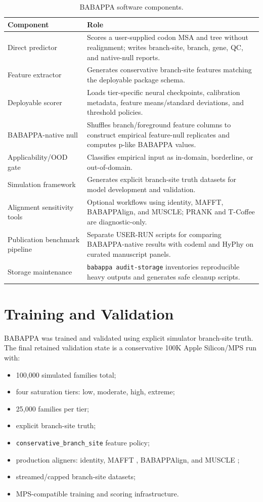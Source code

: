 \documentclass[11pt,a4paper]{article}
\begin{document}
\begin{longtable}{p{}p{}}
\caption{BABAPPA software components.}
\label{tab:components}\\
\toprule
\textbf{Component} & \textbf{Role} \\
\midrule
Direct predictor & Scores a user-supplied codon MSA and tree without realignment; writes branch-site, branch, gene, QC, and native-null reports. \\
Feature extractor & Generates conservative branch-site features matching the deployable package schema. \\
Deployable scorer & Loads tier-specific neural checkpoints, calibration metadata, feature means/standard deviations, and threshold policies. \\
BABAPPA-native null & Shuffles branch/foreground feature columns to construct empirical feature-null replicates and computes p-like BABAPPA values. \\
Applicability/OOD gate & Classifies empirical input as in-domain, borderline, or out-of-domain. \\
Simulation framework & Generates explicit branch-site truth datasets for model development and validation. \\
Alignment sensitivity tools & Optional workflows using identity, MAFFT, BABAPPAlign, and MUSCLE; PRANK and T-Coffee are diagnostic-only. \\
Publication benchmark pipeline & Separate USER-RUN scripts for comparing BABAPPA-native results with codeml and HyPhy on curated manuscript panels. \\
Storage maintenance & \texttt{babappa audit-storage} inventories reproducible heavy outputs and generates safe cleanup scripts. \\
\bottomrule
\end{longtable}

\section{Training and Validation}

BABAPPA was trained and validated using explicit simulator branch-site truth. The final retained validation state is a conservative 100K Apple Silicon/MPS run with:

\begin{itemize}[leftmargin=*]
  \item 100,000 simulated families total;
  \item four saturation tiers: low, moderate, high, extreme;
  \item 25,000 families per tier;
  \item explicit branch-site truth;
  \item \texttt{conservative\_branch\_site} feature policy;
  \item production aligners: identity, MAFFT \citep{katoh2013_mafft}, BABAPPAlign, and MUSCLE \citep{edgar2004_muscle};
  \item streamed/capped branch-site datasets;
  \item MPS-compatible training and scoring infrastructure.
\end{itemize}
\end{document}
